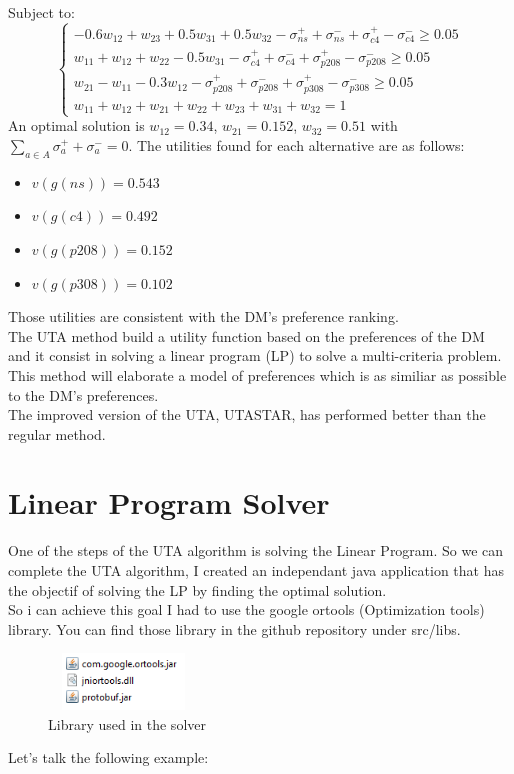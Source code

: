 \documentclass{report}
\begin{document}
Subject to: \\
\begin{equation}
	\begin{cases}
		 -0.6w_{12} + w_{23} + 0.5w_{31} + 0.5w_{32}  -\sigma _{ns}^{+} +\sigma _{ns}^{-} +\sigma _{c4}^{+} - \sigma _{c4}^{-}   \geq 0.05\\
		 w_{11} + w_{12} + w_{22} - 0.5w_{31} -\sigma _{c4}^{+} +\sigma _{c4}^{-} +\sigma _{p208}^{+} - \sigma _{p208}^{-} \geq 0.05 \\
		w_{21} - w_{11} - 0.3w_{12} -\sigma _{p208}^{+} +\sigma _{p208}^{-} +\sigma _{p308}^{+} - \sigma _{p308}^{-}  \geq 0.05 \\
		w_{11} + w_{12} + w_{21} + w_{22} + w_{23} + w_{31} + w_{32} = 1
	\end{cases}
\end{equation}
An optimal solution is $w_{12} = 0.34$, $w_{21} = 0.152$, $w_{32} = 0.51$ with $\sum_{a \in A} \sigma _{a}^{+} + \sigma _{a}^{-} = 0$. The utilities found for each alternative are as follows: \\ 
\begin{itemize}
\item $v(g(ns)) = 0.543$
\item $v(g(c4)) = 0.492$
\item $v(g(p208)) = 0.152 $
\item $v(g(p308)) = 0.102 $
\end{itemize}
Those utilities are consistent with the DM's preference ranking. \\

The UTA method build a utility function based on the preferences of the DM and it consist in solving a linear program (LP) to solve a multi-criteria problem.\\
This method will elaborate a model of preferences which is as similiar as possible to the DM's preferences.\\
The improved version of the UTA, UTASTAR, has performed better than the regular method.

\section{Linear Program Solver}
One of the steps of the UTA algorithm is solving the Linear Program. So we can complete the UTA algorithm, I created an independant java application that has the objectif of solving the LP by finding the optimal solution.\\
So i can achieve this goal I had to use the google ortools (Optimization tools) library. You can find those library in the github repository under src/libs.
\begin{figure}[H]
    	\centering
	\includegraphics[width=4cm,height=1.5cm,keepaspectratio]{lp-libs.png}
	\caption{Library used in the solver}
\end{figure}
Let's talk the following example:\\
\end{document}
